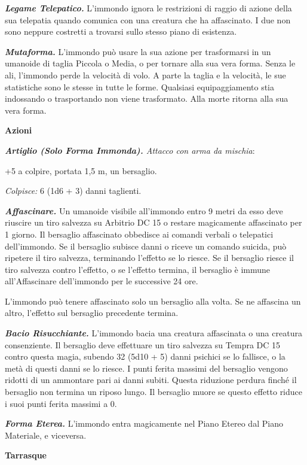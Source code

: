 \begin{multicols}{2}
\emph{\textbf{Legame Telepatico.}} L'immondo ignora le restrizioni di
raggio di azione della sua telepatia quando comunica con una creatura
che ha affascinato. I due non sono neppure costretti a trovarsi sullo
stesso piano di esistenza.

\emph{\textbf{Mutaforma.}} L'immondo può usare la sua azione per
trasformarsi in un umanoide di taglia Piccola o Media, o per tornare
alla sua vera forma. Senza le ali, l'immondo perde la velocità di volo.
A parte la taglia e la velocità, le sue statistiche sono le stesse in
tutte le forme. Qualsiasi equipaggiamento stia indossando o trasportando
non viene trasformato. Alla morte ritorna alla sua vera forma.

\textbf{Azioni}

\emph{\textbf{Artiglio (Solo Forma Immonda).} Attacco con arma da
mischia}:

+5 a colpire, portata 1,5 m, un bersaglio.

\emph{Colpisce:} 6 (1d6 + 3) danni taglienti.

\emph{\textbf{Affascinare.}} Un umanoide visibile all'immondo entro 9
metri da esso deve riuscire un tiro salvezza su Arbitrio DC 15 o restare
magicamente affascinato per 1 giorno. Il bersaglio affascinato obbedisce
ai comandi verbali o telepatici dell'immondo. Se il bersaglio subisce
danni o riceve un comando suicida, può ripetere il tiro salvezza,
terminando l'effetto se lo riesce. Se il bersaglio riesce il tiro
salvezza contro l'effetto, o se l'effetto termina, il bersaglio è immune
all'Affascinare dell'immondo per le successive 24 ore.

L'immondo può tenere affascinato solo un bersaglio alla volta. Se ne
affascina un altro, l'effetto sul bersaglio precedente termina.

\emph{\textbf{Bacio Risucchiante.}} L'immondo bacia una creatura
affascinata o una creatura consenziente. Il bersaglio deve effettuare un
tiro salvezza su Tempra DC 15 contro questa magia, subendo 32
(5d10 + 5) danni psichici se lo fallisce, o la metà di questi danni se
lo riesce. I punti ferita massimi del bersaglio vengono ridotti di un
ammontare pari ai danni subiti. Questa riduzione perdura finché il
bersaglio non termina un riposo lungo. Il bersaglio muore se questo
effetto riduce i suoi punti ferita massimi a 0.

\emph{\textbf{Forma Eterea.}} L'immondo entra magicamente nel Piano
Etereo dal Piano Materiale, e viceversa.

\textbf{Tarrasque}


\end{multicols}
